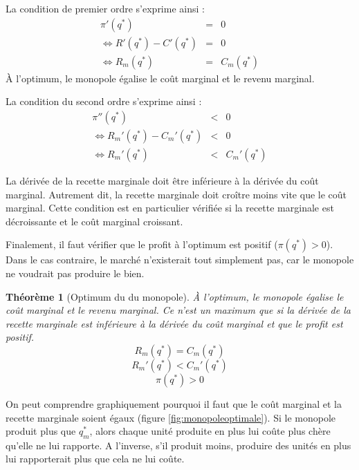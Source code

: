 \documentclass[
  a4paper,
]{book}
\newtheorem{theorem}{Théorème}[chapter]
\theoremstyle{definition}
\theoremstyle{definition}
\theoremstyle{definition}
\theoremstyle{definition}
\theoremstyle{remark}
\begin{document}
La condition de premier ordre s'exprime ainsi :
\[
\begin{array}{rcl}
\pi'(q^*) &=&0\\
\Leftrightarrow R'(q^*) - C'(q^*) &=& 0\\
\Leftrightarrow R_m(q^*) &=&C_m(q^*) 
\end{array}
\]
À l'optimum, le monopole égalise le coût marginal et le revenu marginal.

La condition du second ordre s'exprime ainsi :
\[
\begin{array}{rcl}
\pi''(q^*) &<&0\\
\Leftrightarrow R_m'(q^*) - C_m'(q^*) &<& 0\\
\Leftrightarrow R_m'(q^*) &<& C_m'(q^*)
\end{array}
\]

La dérivée de la recette marginale doit être inférieure à la dérivée du coût marginal.
Autrement dit, la recette marginale doit croître moins vite que le coût marginal.
Cette condition est en particulier vérifiée si la recette marginale est décroissante et le coût marginal croissant.

Finalement, il faut vérifier que le profit à l'optimum est positif (\(\pi(q^*)>0\)).
Dans le cas contraire, le marché n'existerait tout simplement pas, car le monopole ne voudrait pas produire le bien.

\begin{theorem}[Optimum du du monopole]
À l'optimum, le monopole égalise le coût marginal et le revenu marginal.
Ce n'est un maximum que si la dérivée de la recette marginale est inférieure à la dérivée du coût marginal et que le profit est positif.
\begin{equation}
R_m(q^*)=C_m(q^*) 
\label{eq:cpo}
\end{equation}
\begin{equation}
R_m'(q^*) <C_m'(q^*) \label{eq:cso}
\end{equation}
\begin{equation}
\pi(q^*)>0 \label{eq:profitpos}
\end{equation}
\end{theorem}

On peut comprendre graphiquement pourquoi il faut que le coût marginal et la recette marginale soient égaux (figure \ref{fig:monopoleoptimale}).
Si le monopole produit plus que \(q_m^*\), alors chaque unité produite en plus lui coûte plus chère qu'elle ne lui rapporte.
A l'inverse, s'il produit moins, produire des unités en plus lui rapporterait plus que cela ne lui coûte.
\end{document}
